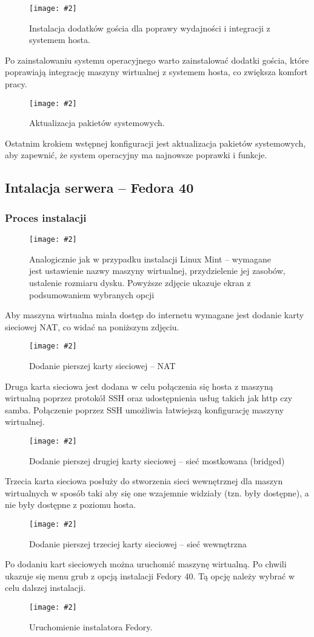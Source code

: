 \documentclass[a4paper]{article}
\newcommand*{\zdj}[2][\textwidth]{\texttt{[image: \#2]}}
\newcommand*{\fg}[4][!htb]{
      \begin{figure*}[#1]
            \zdj{#2}
            \caption[#4]{#3}
      \end{figure*}
}
\begin{document}
\fg{contents/OS_installation/Linux_mint/9.png}{Instalacja dodatków gościa dla poprawy wydajności i integracji z systemem hosta.}{Instalacja dodatków gościa}

Po zainstalowaniu systemu operacyjnego warto zainstalować dodatki gościa, które poprawiają integrację maszyny wirtualnej z systemem hosta, co zwiększa komfort pracy.

\fg{contents/OS_installation/Linux_mint/10.png}{Aktualizacja pakietów systemowych.}{Aktualizacja pakietów}

Ostatnim krokiem wstępnej konfiguracji jest aktualizacja pakietów systemowych, aby zapewnić, że system operacyjny ma najnowsze poprawki i funkcje.
\newpage
\subsection{Intalacja serwera – Fedora 40}
\subsubsection{Proces instalacji}
\fg{contents/OS_installation/Fedora40/4.png}{Analogicznie jak w przypadku instalacji Linux Mint – wymagane jest ustawienie nazwy maszyny wirtualnej, przydzielenie jej zasobów, ustalenie rozmiaru dysku. Powyższe zdjęcie ukazuje ekran z podsumowaniem wybranych opcji}{Podsumowanie maszyny wirtualnej Fedora 40}
Aby maszyna wirtualna miała dostęp do internetu wymagane jest dodanie karty sieciowej NAT, co widać na poniższym zdjęciu.
\fg{contents/OS_installation/Fedora40/5.png}{Dodanie pierszej karty sieciowej – NAT}{Dodanie pierszej karty sieciowej}
\newpage
Druga karta sieciowa jest dodana w celu połączenia się hosta z maszyną wirtualną poprzez protokół SSH oraz udostępnienia usług takich jak http czy samba. Połączenie poprzez SSH umożliwia łatwiejszą konfigurację maszyny wirtualnej.
\fg{contents/OS_installation/Fedora40/6.png}{Dodanie pierszej drugiej karty sieciowej – sieć mostkowana (bridged)}{Dodanie drugiej karty sieciowej}

Trzecia karta sieciowa posłuży do stworzenia sieci wewnętrznej dla maszyn wirtualnych w sposób taki aby się one wzajemnie widziały (tzn. były dostępne), a nie były dostępne z poziomu hosta.
\fg{contents/OS_installation/Fedora40/7.png}{Dodanie pierszej trzeciej karty sieciowej – sieć wewnętrzna}{Dodanie trzeciej karty sieciowej}
\newpage
Po dodaniu kart sieciowych można uruchomić maszynę wirtualną. Po chwili ukazuje się menu grub z opcją instalacji Fedory 40. Tą opcję należy wybrać w celu dalszej instalacji.
\fg{contents/OS_installation/Fedora40/8.png}{Uruchomienie instalatora Fedory.}{Uruchomienie instalatora Fedory.}
\end{document}
